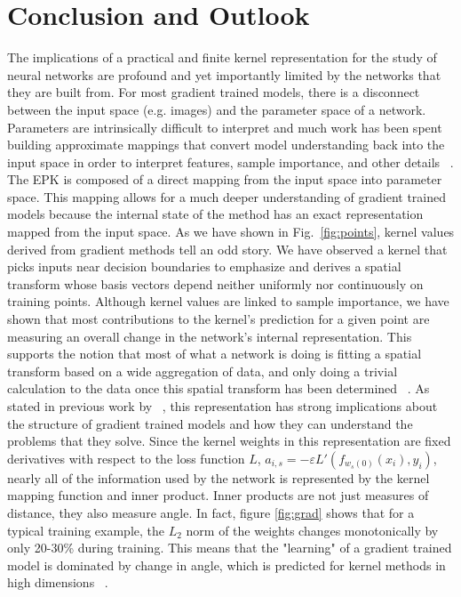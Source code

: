\section{Conclusion and Outlook} %
The implications of a practical and finite kernel representation for the study of neural networks are profound and yet importantly limited by the networks that they are built from. For most gradient trained models, there is a disconnect between the input space (e.g. images) and the parameter space of a network. Parameters are intrinsically difficult to interpret and much work has been spent building approximate mappings that convert model understanding back into the input space in order to interpret features, sample importance, and other details ~\citep{simonyan2013deep, lundberg2017unified, Selvaraju_2019}. The EPK is composed of a direct mapping from the input space into parameter space. This mapping allows for a much deeper understanding of gradient trained models because the internal state of the method has an exact representation mapped from the input space. As we have shown in Fig.~\ref{fig:points}, kernel values derived from gradient methods tell an odd story. We have observed a kernel that picks inputs near decision boundaries to emphasize and derives a spatial transform whose basis vectors depend neither uniformly nor continuously on training points. Although kernel values are linked to sample importance, we have shown that most contributions to the kernel's prediction for a given point are measuring an overall change in the network's internal representation. This supports the notion that most of what a network is doing is fitting a spatial transform based on a wide aggregation of data, and only doing a trivial calculation to the data once this spatial transform has been determined ~\citep{chizat2020maxmargin}. 
As stated in previous work by ~\citet{domingos2020}, this representation has strong implications about the structure of gradient trained models and how they can understand the problems that they solve. Since the kernel weights in this representation are fixed derivatives with respect to the loss function $L$, $a_{i, s} = -\varepsilon  L'(f_{w_s(0)}(x_i),  y_i)$, nearly all of the information used by the network is represented by the kernel mapping function and inner product. Inner products are not just measures of distance, they also measure angle. In fact, figure \ref{fig:grad} shows that for a typical training example, the $L_2$ norm of the weights changes monotonically by only 20-30\% during training. This means that the "learning" of a gradient trained model is dominated by change in angle, which is predicted for kernel methods in high dimensions ~\citep{hardle2004nonparametric}.

